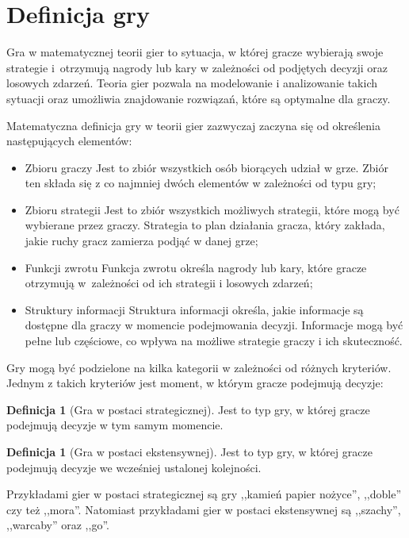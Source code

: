 \documentclass[inzynierska]{pwr_wmat_praca_dyplomowa}
\theoremstyle{plain}
\numberwithin{theorem}{chapter}
\theoremstyle{definition}
\numberwithin{theorem}{chapter}
\newtheorem{definition}[theorem]{Definicja}
\begin{document}
\section{Definicja gry}
Gra w matematycznej teorii gier to sytuacja, w której gracze wybierają swoje strategie i~otrzymują nagrody lub kary w zależności od podjętych decyzji  oraz losowych zdarzeń. Teoria gier pozwala na modelowanie i analizowanie takich sytuacji oraz umożliwia znajdowanie rozwiązań, które są optymalne dla graczy.

Matematyczna definicja gry w teorii gier zazwyczaj zaczyna się od określenia następujących elementów:
\begin{itemize}
	\item Zbioru graczy \pauza Jest to zbiór wszystkich osób biorących udział w grze. Zbiór ten składa się z co najmniej dwóch elementów w zależności od typu gry;
	
	\item Zbioru strategii \pauza Jest to zbiór wszystkich możliwych strategii, które mogą być wybierane przez graczy. Strategia to plan działania gracza, który zakłada, jakie ruchy gracz zamierza podjąć w danej grze;
	
	\item Funkcji zwrotu \pauza Funkcja zwrotu określa nagrody lub kary, które gracze otrzymują w~zależności od ich strategii i losowych zdarzeń;
	
	\item Struktury informacji \pauza Struktura informacji określa, jakie informacje są dostępne dla graczy w momencie podejmowania decyzji. Informacje mogą być pełne lub częściowe, co wpływa na możliwe strategie graczy i ich skuteczność.
\end{itemize}

Gry mogą być podzielone na kilka kategorii w zależności od różnych kryteriów. Jednym z takich kryteriów jest moment, w którym gracze podejmują decyzje:

\begin{definition}[Gra w postaci strategicznej]
Jest to typ gry, w której gracze podejmują decyzje w tym samym
momencie.
\end{definition}
\begin{definition}[Gra w postaci ekstensywnej]
	Jest to typ gry, w której gracze podejmują decyzje we wcześniej ustalonej kolejności.
\end{definition}
\noindent
Przykładami gier w postaci strategicznej są gry ,,kamień papier nożyce'', ,,doble'' czy też ,,mora''. Natomiast przykładami gier w postaci ekstensywnej są ,,szachy'', ,,warcaby'' oraz ,,go''.
\end{document}

